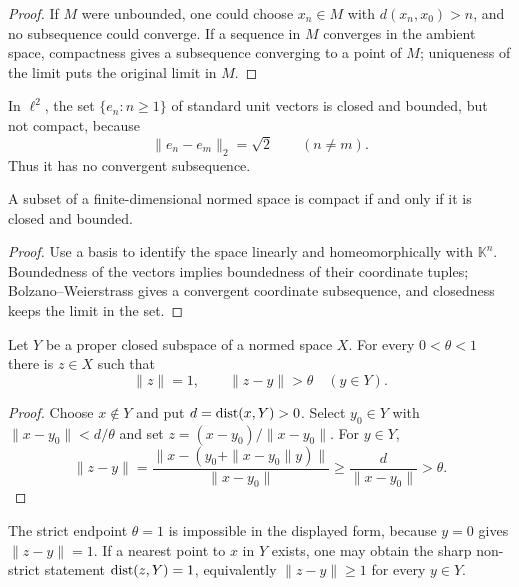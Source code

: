 \begin{proof}
If $M$ were unbounded, one could choose $x_n\in M$ with
$d(x_n,x_0)>n$, and no subsequence could converge.  If a sequence in $M$
converges in the ambient space, compactness gives a subsequence converging to
a point of $M$; uniqueness of the limit puts the original limit in $M$.
\end{proof}

\begin{noteexample}
In $\ell^2$, the set $\{e_n:n\ge1\}$ of standard unit vectors is closed and
bounded, but not compact, because
\[
  \|e_n-e_m\|_2=\sqrt2\qquad(n\ne m).
\]
Thus it has no convergent subsequence.
\end{noteexample}

\begin{notetheorem}
A subset of a finite-dimensional normed space is compact if and only if it is
closed and bounded.
\end{notetheorem}

\begin{proof}
Use a basis to identify the space linearly and homeomorphically with
$\mathbb K^n$.  Boundedness of the vectors implies boundedness of their
coordinate tuples; Bolzano--Weierstrass gives a convergent coordinate
subsequence, and closedness keeps the limit in the set.
\end{proof}

\begin{notelemma}
Let $Y$ be a proper closed subspace of a normed space $X$.  For every
$0<\theta<1$ there is $z\in X$ such that
\[
  \|z\|=1,
  \qquad
  \|z-y\|>\theta\quad(y\in Y).
\]
\end{notelemma}

\begin{proof}
Choose $x\notin Y$ and put $d=\operatorname{dist}(x,Y)>0$.  Select $y_0\in Y$ with
$\|x-y_0\|<d/\theta$ and set
$z=(x-y_0)/\|x-y_0\|$.  For $y\in Y$,
\[
  \|z-y\|
  =\frac{\|x-(y_0+\|x-y_0\|y)\|}{\|x-y_0\|}
  \ge\frac d{\|x-y_0\|}>\theta.
\]
\end{proof}

\begin{noteremark}
The strict endpoint $\theta=1$ is impossible in the displayed form, because
$y=0$ gives $\|z-y\|=1$.  If a nearest point to $x$ in $Y$ exists, one may
obtain the sharp non-strict statement
$\operatorname{dist}(z,Y)=1$, equivalently $\|z-y\|\ge1$ for every $y\in Y$.
\end{noteremark}

